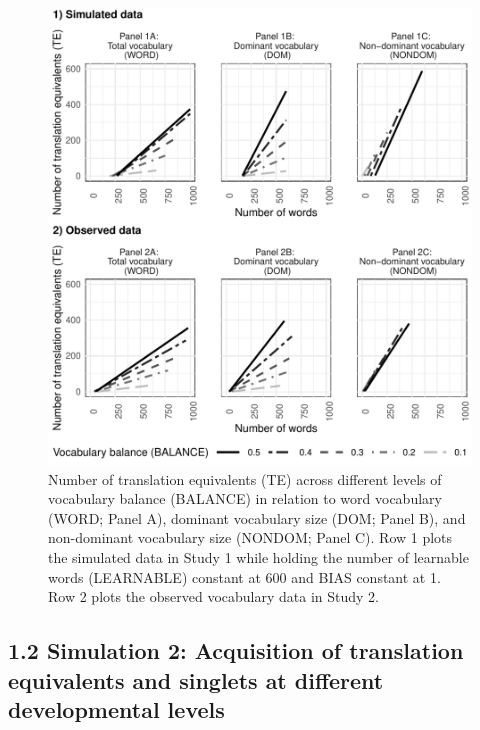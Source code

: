 \documentclass[
  english,
  ,man,floatsintext]{apa6}
\begin{document}
\begin{figure}[H]

{\centering \includegraphics[width=1.1\linewidth,height=0.8\textheight]{paper_TE_bilingual_vocabulary_model_files/figure-latex/fig1-1} 

}

\caption{Number of translation equivalents (TE) across different levels of vocabulary balance (BALANCE) in relation to word vocabulary (WORD; Panel A), dominant vocabulary size (DOM; Panel B), and non-dominant vocabulary size (NONDOM; Panel C). Row 1 plots the simulated data in Study 1 while holding the number of learnable words (LEARNABLE) constant at 600 and BIAS constant at 1. Row 2 plots the observed vocabulary data in Study 2.}\label{fig:fig1}
\end{figure}

\hypertarget{simulation-2-acquisition-of-translation-equivalents-and-singlets-at-different-developmental-levels}{%
\subsection{1.2 Simulation 2: Acquisition of translation equivalents and singlets at different developmental levels}\label{simulation-2-acquisition-of-translation-equivalents-and-singlets-at-different-developmental-levels}}
\end{document}
